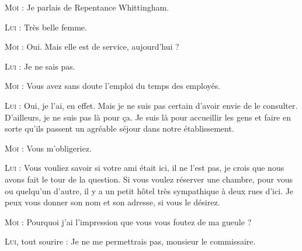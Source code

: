 \begin{dialogue}
\textsc{Moi} : Je parlais de Repentance Whittingham.

\textsc{Lui} : Très belle femme.

\textsc{Moi} : Oui. Mais elle est de service, aujourd’hui ?

\textsc{Lui} : Je ne sais pas.

\textsc{Moi} : Vous avez sans doute l’emploi du temps des employés.

\textsc{Lui} : Oui, je l’ai, en effet. Mais je ne suis pas certain d’avoir envie de le consulter. D’ailleurs, je ne suis pas là pour ça. Je suis là pour accueillir les gens et faire en sorte qu’ils passent un agréable séjour dans notre établissement.

\textsc{Moi} : Vous m’obligeriez.

\textsc{Lui} : Vous vouliez savoir si votre ami était ici, il ne l’est pas, je crois que nous avons fait le tour de la question. Si vous voulez réserver une chambre, pour vous ou quelqu’un d’autre, il y a un petit hôtel très sympathique à deux rues d’ici. Je peux vous donner son nom et son adresse, si vous le désirez.

\textsc{Moi} : Pourquoi j’ai l’impression que vous vous foutez de ma gueule ?

\textsc{Lui}, tout sourire : Je ne me permettrais pas, monsieur le commissaire.

\end{dialogue}